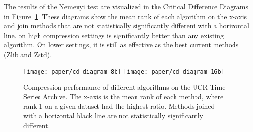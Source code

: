 The results of the Nemenyi test are visualized in the Critical Difference Diagrams \cite{cdDiagrams} in Figure~\ref{fig:ratioCD}. These diagrams show the mean rank of each algorithm on the x-axis and join methods that are not statistically significantly different with a horizontal line. \minesp on high compression settings is significantly better than any existing algorithm. On lower settings, it is still as effective as the best current methods (Zlib and Zstd).





\begin{figure}[h]
\begin{center}
    \texttt{[image: paper/cd\_diagram\_8b]}
    \texttt{[image: paper/cd\_diagram\_16b]}
    \caption{Compression performance of different algorithms on the UCR Time Series Archive. The x-axis is the mean rank of each method, where rank 1 on a given dataset had the highest ratio. Methods joined with a horizontal black line are not statistically significantly different.}
    \label{fig:ratioCD}
\end{center}
\end{figure}

